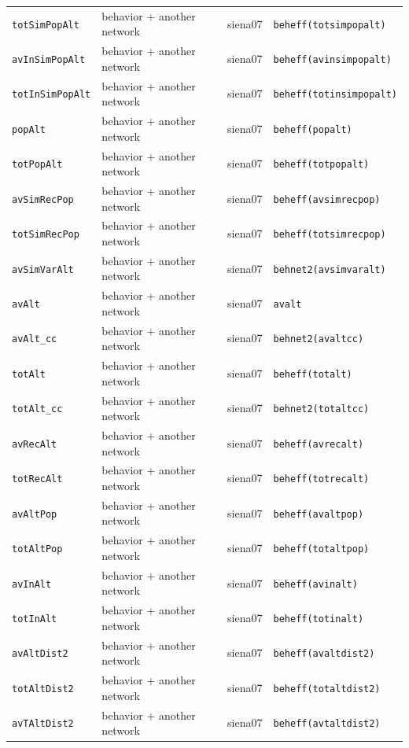 \begin{longtable}{@{}p{2.6cm}p{3.2cm}p{2.9cm}p{5.4cm}@{}}
\texttt{totSimPopAlt} & behavior + another network & siena07 & \texttt{beheff(totsimpopalt)}\\
\texttt{avInSimPopAlt} & behavior + another network & siena07 & \texttt{beheff(avinsimpopalt)}\\
\texttt{totInSimPopAlt} & behavior + another network & siena07 & \texttt{beheff(totinsimpopalt)}\\
\texttt{popAlt} & behavior + another network & siena07 & \texttt{beheff(popalt)}\\
\texttt{totPopAlt} & behavior + another network & siena07 & \texttt{beheff(totpopalt)}\\
\texttt{avSimRecPop} & behavior + another network & siena07 & \texttt{beheff(avsimrecpop)}\\
\texttt{totSimRecPop} & behavior + another network & siena07 & \texttt{beheff(totsimrecpop)}\\
\texttt{avSimVarAlt} & behavior + another network & siena07 & \texttt{behnet2(avsimvaralt)}\\
\texttt{avAlt} & behavior + another network & siena07 & \texttt{avalt}\\
\texttt{avAlt\_cc} & behavior + another network & siena07 & \texttt{behnet2(avaltcc)}\\
\texttt{totAlt} & behavior + another network & siena07 & \texttt{beheff(totalt)}\\
\texttt{totAlt\_cc} & behavior + another network & siena07 & \texttt{behnet2(totaltcc)}\\
\texttt{avRecAlt} & behavior + another network & siena07 & \texttt{beheff(avrecalt)}\\
\texttt{totRecAlt} & behavior + another network & siena07 & \texttt{beheff(totrecalt)}\\
\texttt{avAltPop} & behavior + another network & siena07 & \texttt{beheff(avaltpop)}\\
\texttt{totAltPop} & behavior + another network & siena07 & \texttt{beheff(totaltpop)}\\
\texttt{avInAlt} & behavior + another network & siena07 & \texttt{beheff(avinalt)}\\
\texttt{totInAlt} & behavior + another network & siena07 & \texttt{beheff(totinalt)}\\
\texttt{avAltDist2} & behavior + another network & siena07 & \texttt{beheff(avaltdist2)}\\
\texttt{totAltDist2} & behavior + another network & siena07 & \texttt{beheff(totaltdist2)}\\
\texttt{avTAltDist2} & behavior + another network & siena07 & \texttt{beheff(avtaltdist2)}\\

\end{longtable}
